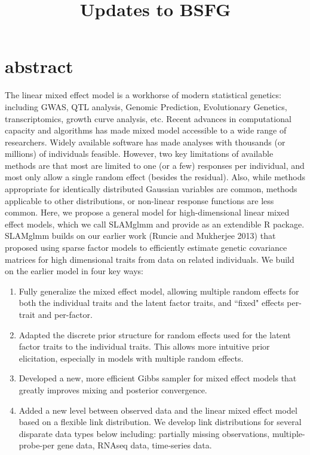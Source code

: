 \documentclass[11pt]{amsart}
\title{Updates to BSFG}                %
\begin{document}
\maketitle
\tableofcontents
\label{TOC}

\section{abstract}
The linear mixed effect model is a workhorse of modern statistical genetics: including GWAS, QTL analysis, Genomic Prediction, Evolutionary Genetics, transcriptomics, growth curve analysis, etc. 
Recent advances in computational capacity and algorithms has made mixed model accessible to a wide range of researchers.
Widely available software has made analyses with thousands (or millions) of individuals feasible. However, two key limitations of
available methods are that most are limited to one (or a few) responses per individual, and most only allow a single random effect (besides the residual). Also, while methods appropriate for identically distributed Gaussian variables are common, methods applicable to other distributions, or non-linear response functions are less common. Here, we propose a general model for high-dimensional linear mixed effect models, which we call SLAMglmm and provide as an extendible R package. SLAMglmm builds on our earlier work (Runcie and Mukherjee 2013) that proposed using sparse factor models to efficiently estimate genetic covariance matrices for high dimensional traits from data on related individuals. We build on the earlier model in four key ways:

\begin{enumerate}
\item Fully generalize the mixed effect model, allowing multiple random effects for both the individual traits and the latent factor traits, and ``fixed" effects per-trait and per-factor.
\item Adapted the discrete prior structure for random effects used for the latent factor traits to the individual traits. This allows more intuitive prior elicitation, especially in models with multiple random effects.
\item Developed a new, more efficient Gibbs sampler for mixed effect models that greatly improves mixing and posterior convergence.
\item Added a new level between observed data and the linear mixed effect model based on a flexible link distribution. We develop link distributions for several disparate data types below including: partially missing observations, multiple-probe-per gene data, RNAseq data, time-series data.
\end{enumerate}
\end{document}
